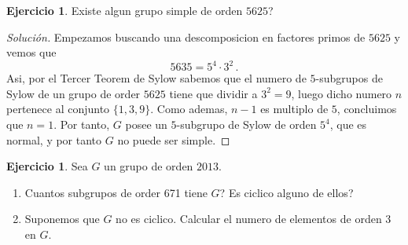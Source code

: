 \documentclass[a4paper,11pt]{amsart}
\theoremstyle{plain}
\theoremstyle{definition}
\newtheorem{ejercicio}[thm]{Ejercicio}
\theoremstyle{remark}
\newenvironment{solution}
  {\begin{proof}[Solución]}
  {\end{proof}}
\begin{document}
\begin{ejercicio}
Existe algun grupo simple de orden $5625$?
\end{ejercicio}

\begin{solution}
Empezamos buscando una descomposicion en factores primos de $5625$ y vemos que 
\[ 5635 = 5^4 \cdot 3^2 \, .\]
Asi, por el Tercer Teorem de Sylow sabemos que el numero de $5$-subgrupos de Sylow de un grupo de order $5625$ tiene que dividir a $3^2 = 9$, luego dicho numero $n$ pertenece al conjunto $\{1, 3, 9\}$. Como ademas, $n -1$ es multiplo de $5$, concluimos que $n = 1$. Por tanto, $G$ posee un $5$-subgrupo de Sylow de orden $5^4$, que es normal, y por tanto $G$ no puede ser simple.
\end{solution}

\begin{ejercicio}
Sea $G$ un grupo de orden $2013$. 
\begin{enumerate}
    \item Cuantos subgrupos de order 671 tiene $G$? Es ciclico alguno de ellos?
    \item Suponemos que $G$ no es ciclico. Calcular el numero de elementos de orden 3 en $G$.
\end{enumerate}
\end{ejercicio}
\end{document}
